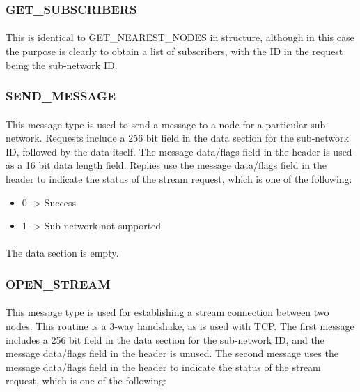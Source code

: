 \documentclass{article}
\begin{document}
\subsubsection{GET_SUBSCRIBERS}

\paragraph{}
This is identical to GET_NEAREST_NODES in structure, although in this case the purpose is clearly to obtain a list of subscribers, with the ID in the request being the sub-network ID.

\subsubsection{SEND_MESSAGE}

\paragraph{}
This message type is used to send a message to a node for a particular sub-network.
Requests include a 256 bit field in the data section for the sub-network ID, followed by the data itself. The message data/flags field in the header is used as a 16 bit data length field.
Replies use the message data/flags field in the header to indicate the status of the stream request, which is one of the following:

\begin{itemize}
\item 0 -> Success
\item 1 -> Sub-network not supported
\end{itemize}

\paragraph{}
The data section is empty.

\subsubsection{OPEN_STREAM}

\paragraph{}
This message type is used for establishing a stream connection between two nodes.
This routine is a 3-way handshake, as is used with TCP.
The first message includes a 256 bit field in the data section for the sub-network ID, and the message data/flags field in the header is unused.
The second message uses the message data/flags field in the header to indicate the status of the stream request, which is one of the following:
\end{document}
